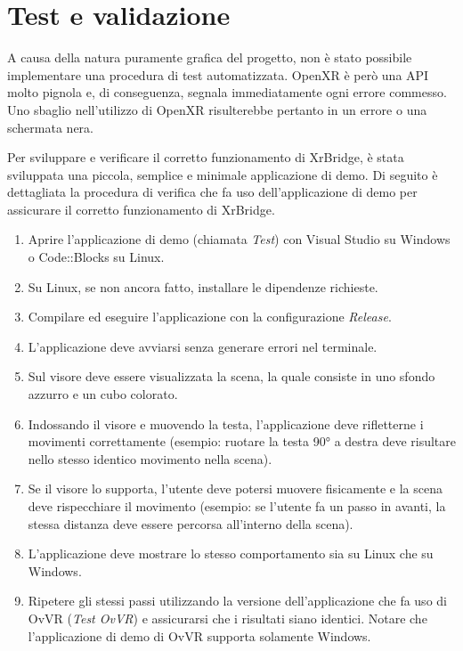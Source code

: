 \documentclass[twoside]{supsistudent}
\begin{document}
\chapter{Test e validazione}

A causa della natura puramente grafica del progetto, non è stato possibile implementare una procedura di test automatizzata. OpenXR è però una API molto pignola e, di conseguenza, segnala immediatamente ogni errore commesso. Uno sbaglio nell'utilizzo di OpenXR risulterebbe pertanto in un errore o una schermata nera.

Per sviluppare e verificare il corretto funzionamento di XrBridge, è stata sviluppata una piccola, semplice e minimale applicazione di demo. Di seguito è dettagliata la procedura di verifica che fa uso dell'applicazione di demo per assicurare il corretto funzionamento di XrBridge.

\begin{enumerate}
  \item Aprire l'applicazione di demo (chiamata \textit{Test}) con Visual Studio su Windows o Code::Blocks su Linux.
  \item Su Linux, se non ancora fatto, installare le dipendenze richieste.
  \item Compilare ed eseguire l'applicazione con la configurazione \textit{Release}.
  \item L'applicazione deve avviarsi senza generare errori nel terminale.
  \item Sul visore deve essere visualizzata la scena, la quale consiste in uno sfondo azzurro e un cubo colorato.
  \item Indossando il visore e muovendo la testa, l'applicazione deve rifletterne i movimenti correttamente (esempio: ruotare la testa 90° a destra deve risultare nello stesso identico movimento nella scena).
  \item Se il visore lo supporta, l'utente deve potersi muovere fisicamente e la scena deve rispecchiare il movimento (esempio: se l'utente fa un passo in avanti, la stessa distanza deve essere percorsa all'interno della scena).
  \item L'applicazione deve mostrare lo stesso comportamento sia su Linux che su Windows.
  \item Ripetere gli stessi passi utilizzando la versione dell'applicazione che fa uso di OvVR (\textit{Test OvVR}) e assicurarsi che i risultati siano identici. Notare che l'applicazione di demo di OvVR supporta solamente Windows.
\end{enumerate}
\end{document}

